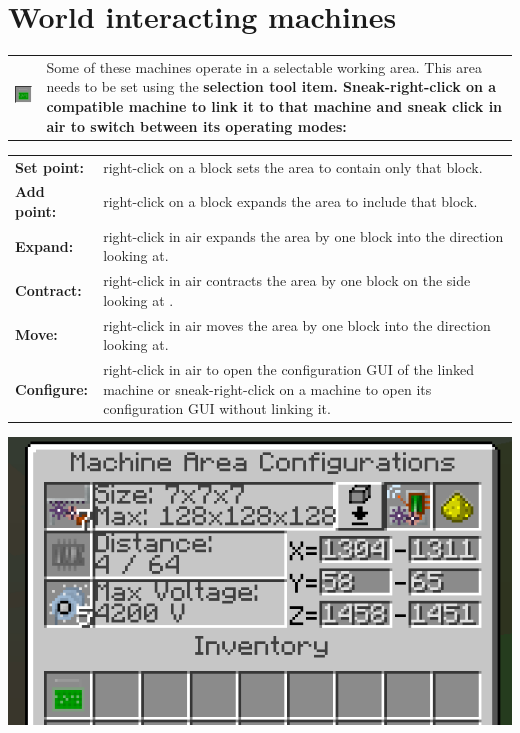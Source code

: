 \documentclass[11pt]{article} %
\makeatletter
\newcommand{\imgtex}{\begin{tabularx}{\textwidth}{@{}c@{ }X@{}}}
\makeatother
\begin{document}
\section{World interacting machines}
\imgtex
\includegraphics[align = t]{itemSelectionTool} & Some of these machines operate in a selectable working area. This area needs to be set using the \bf selection tool \rm item. Sneak-right-click on a compatible machine to link it to that machine and sneak click in air to switch between its operating modes: \\
\end{tabularx}
\begin{tabularx}{\textwidth}{@{} l @{ } X @{}}
\bf Set point: & \rm right-click on a block sets the area to contain only that block. \\
\bf Add point: & \rm right-click on a block expands the area to include that block. \\
\bf Expand: & \rm right-click in air expands the area by one block into the direction looking at. \\
\bf Contract: & \rm right-click in air contracts the area by one block on the side looking at . \\
\bf Move: & \rm right-click in air moves the area by one block into the direction looking at. \\
\bf Configure: & \rm right-click in air to open the configuration GUI of the linked machine or sneak-right-click on a machine to open its configuration GUI without linking it. \\
\end{tabularx}
\includegraphics[width = \textwidth]{selectionTool} \\
\end{document}
